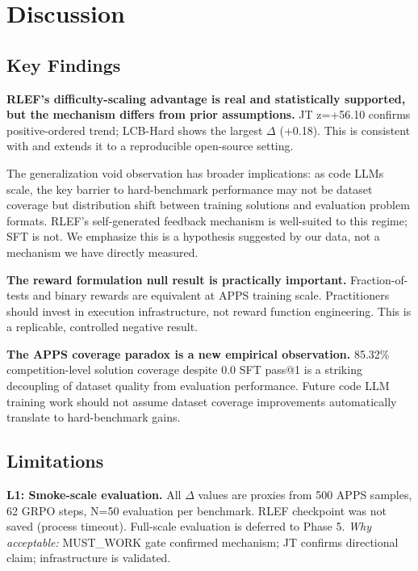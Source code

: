 \section{Discussion}
\label{sec:discussion}

\subsection{Key Findings}

\textbf{RLEF's difficulty-scaling advantage is real and statistically supported, but the mechanism differs from prior assumptions.} JT z=+56.10 confirms positive-ordered trend; LCB-Hard shows the largest $\Delta$ (+0.18). This is consistent with \cite{Gehring2024RLEF} and extends it to a reproducible open-source setting.

The generalization void observation has broader implications: as code LLMs scale, the key barrier to hard-benchmark performance may not be dataset coverage but distribution shift between training solutions and evaluation problem formats. RLEF's self-generated feedback mechanism is well-suited to this regime; SFT is not. We emphasize this is a hypothesis suggested by our data, not a mechanism we have directly measured.

\textbf{The reward formulation null result is practically important.} Fraction-of-tests and binary rewards are equivalent at APPS training scale. Practitioners should invest in execution infrastructure, not reward function engineering. This is a replicable, controlled negative result.

\textbf{The APPS coverage paradox is a new empirical observation.} 85.32\% competition-level solution coverage despite 0.0 SFT pass@1 is a striking decoupling of dataset quality from evaluation performance. Future code LLM training work should not assume dataset coverage improvements automatically translate to hard-benchmark gains.

\subsection{Limitations}

\textbf{L1: Smoke-scale evaluation.} All $\Delta$ values are proxies from 500 APPS samples, 62 GRPO steps, N=50 evaluation per benchmark. RLEF checkpoint was not saved (process timeout). Full-scale evaluation is deferred to Phase 5. \textit{Why acceptable:} MUST\_WORK gate confirmed mechanism; JT confirms directional claim; infrastructure is validated.

